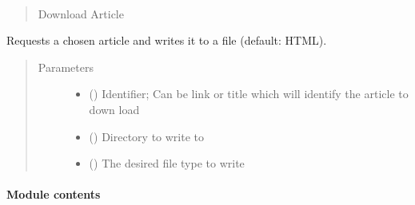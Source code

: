 \documentclass[letterpaper,10pt,english]{sphinxmanual}
\begin{document}
\begin{fulllineitems}
\begin{fulllineitems}
\end{fulllineitems}


\begin{fulllineitems}
\label{\detokenize{anfrss.parser:anfrss.parser.anffeed.ANFFeed.download_article}}~\begin{quote}

Download Article
\end{quote}

Requests a chosen article
and writes it to a file
(default: HTML).
\begin{quote}\begin{description}
\item[{Parameters}] \leavevmode\begin{itemize}
\item {} 
 () \textendash{} Identifier;
Can be link or title
which will identify
the article to down\sphinxhyphen{}
load

\item {} 
 () \textendash{} Directory
to write to

\item {} 
 (\sphinxstyleliteralemphasis{\sphinxupquote{, }}) \textendash{} The desired
file type to write

\end{itemize}

\end{description}\end{quote}

\end{fulllineitems}


\end{fulllineitems}



\paragraph{Module contents}
\label{\detokenize{anfrss.parser:module-anfrss.parser}}\label{\detokenize{anfrss.parser:module-contents}}
\end{document}
